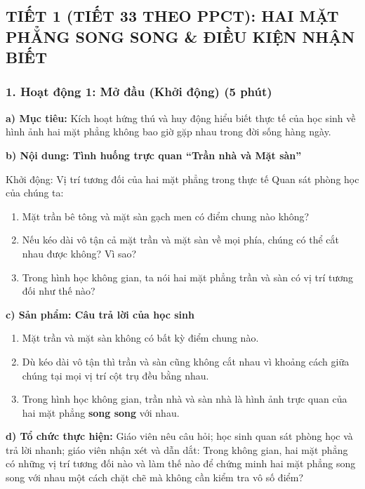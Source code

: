 \documentclass[12pt, a4paper]{article}
\begin{document}
\subsection*{TIẾT 1 (TIẾT 33 THEO PPCT): HAI MẶT PHẲNG SONG SONG \& ĐIỀU KIỆN NHẬN BIẾT}

\subsubsection*{1. Hoạt động 1: Mở đầu (Khởi động) (5 phút)}

\noindent \textbf{a) Mục tiêu:}
Kích hoạt hứng thú và huy động hiểu biết thực tế của học sinh về hình ảnh hai mặt phẳng không bao giờ gặp nhau trong đời sống hàng ngày.

\noindent \textbf{b) Nội dung: Tình huống trực quan ``Trần nhà và Mặt sàn''}
\begin{pedabox}{Khởi động: Vị trí tương đối của hai mặt phẳng trong thực tế}
Quan sát phòng học của chúng ta:
\begin{enumerate}[leftmargin=0.6cm]
    \item Mặt trần bê tông và mặt sàn gạch men có điểm chung nào không?
    \item Nếu kéo dài vô tận cả mặt trần và mặt sàn về mọi phía, chúng có thể cắt nhau được không? Vì sao?
    \item Trong hình học không gian, ta nói hai mặt phẳng trần và sàn có vị trí tương đối như thế nào?
\end{enumerate}
\end{pedabox}

\noindent \textbf{c) Sản phẩm: Câu trả lời của học sinh}
\begin{enumerate}[leftmargin=0.6cm]
    \item Mặt trần và mặt sàn không có bất kỳ điểm chung nào.
    \item Dù kéo dài vô tận thì trần và sàn cũng không cắt nhau vì khoảng cách giữa chúng tại mọi vị trí cột trụ đều bằng nhau.
    \item Trong hình học không gian, trần nhà và sàn nhà là hình ảnh trực quan của hai mặt phẳng \textbf{song song} với nhau.
\end{enumerate}

\noindent \textbf{d) Tổ chức thực hiện:}
Giáo viên nêu câu hỏi; học sinh quan sát phòng học và trả lời nhanh; giáo viên nhận xét và dẫn dắt: Trong không gian, hai mặt phẳng có những vị trí tương đối nào và làm thế nào để chứng minh hai mặt phẳng song song với nhau một cách chặt chẽ mà không cần kiểm tra vô số điểm?
\end{document}
